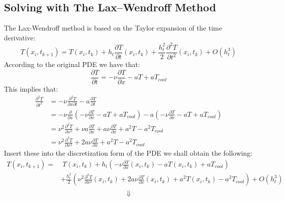 \documentclass[11pt,a4paper,roman]{scrartcl}
\begin{document}
\subsection*{Solving with The Lax–Wendroff Method}
The Lax-Wendroff method is based on the Taylor expansion of the time derivative:
\begin{equation}
T(x_i,t_{k+1}) = T(x_i,t_k)+h_t\frac{\partial T}{\partial t}(x_i, t_k) + \frac{h_t^2}{2}\frac{\partial^2 T}{\partial t^2}(x_i, t_k) + O(h_t^3)
\end{equation}
According to the original PDE we have that: 
\begin{equation}
\frac{\partial T}{\partial t} = -\nu\frac{\partial T}{\partial x} - a T + a T_{cool} 
\end{equation}
This implies that: 
\begin{equation}
\begin{aligned}
\frac{\partial^2 T}{\partial t^2} & = -\nu\frac{\partial^2 T}{\partial x \partial t} - a\frac{\partial T}{\partial t} \\
& = -\nu \frac{\partial}{\partial x}(-\nu\frac{\partial T}{\partial x} - a T + a T_{cool} ) - a (-\nu\frac{\partial T}{\partial x} - a T + a T_{cool} ) \\
& = \nu^2 \frac{\partial^2 T}{\partial x^2} + \nu a \frac{\partial T}{\partial x} + a \nu \frac{\partial T}{\partial x} + a^2 T -a^2 T_{cool} \\
& = \nu^2 \frac{\partial^2 T}{\partial x^2} + 2  a \nu \frac{\partial T}{\partial x} + a^2 T -a^2 T_{cool} 
\end{aligned}
\end{equation}
Insert these into the discretization form of the PDE we shall obtain the following: 
\begin{equation}
\begin{aligned}
T(x_i,t_{k+1}) = & \; T(x_i,t_k)  + h_t\left(-\nu\frac{\partial T}{\partial x}(x_i, t_k) - a T(x_i, t_k) + a T_{cool}\right) \\
& + \frac{h_t^2}{2}\left(\nu^2 \frac{\partial^2 T}{\partial x^2}(x_i, t_k) + 2  a \nu \frac{\partial T}{\partial x}(x_i, t_k) + a^2 T(x_i, t_k) -a^2 T_{cool} \right) + O(h_t^3) \\ 
\end{aligned}
\end{equation}
\begin{equation*}
\Downarrow
\end{equation*}
\end{document}
